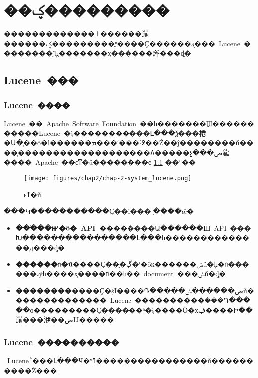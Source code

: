 
\chapter{��ؼ���������}
\label{chap:technology}

�������������±������漰������ؼ���������֪ʶ����Ҫ������ƽ̨���~Lucene~��������ĵķִ�������ҳ������㷨���ܵȡ�

\section{Lucene~���}

\subsection{Lucene~����}

Lucene~��~Apache~Software~Foundation~��һ�������Ϣ���������\cite{lucene_introduce}��Lucene~�ṩ�����������Լ���ѯ���棬�Ա�֧��ȫ�ļ������ܡ���ʹ���˸߶��Ż��ĵ��������ṹ����֧����������\cite{lucene_introduce2}���������ܸߡ�����չ���ص㡣����~Apache~��ϵͳ�ṹ��������ͼ \ref{fig:lucene_system} ��ʾ��

    \begin{figure}[htbp]
        \centering
        \texttt{[image: figures/chap2/chap-2-system\_lucene.png]}
        \vspace{-1em}
        \caption{ϵͳ�ṹ}
        \label{fig:lucene_system}
    \end{figure}

���Կ�����������Ҫ��Ϊ���󲿷֣��ֱ��ǣ�

    \begin{itemize}
      \item \textbf{���ֹ��ⲿʹ�õ�~API~}��������Ա������Щ~API~���Խ����������������Լ���һ��������������д���ȡ�
      \item \textbf{������װ�ṹ}����Ҫ��ָ�ڲ�ʹ�õĸ������ݽṹ�ķ�װ������˵ÿһ����ҳ����װ��һ��~document~���ݽṹ�ȡ�
      \item \textbf{��������}����Ҫ�ṩΪ����Դ�����ض������ݽṹ��������������~Lucene~����������ܵ���Դ�����ɵ���������Ҫ������ʱ�ṩ����Ӧ�ӿڣ����Ի��漰���洢��صĲ�����
    \end{itemize}

\subsection{Lucene~����������}

~Lucene~֮���Լ���Ч�ʸߣ����������������ṹ����������Ż���

